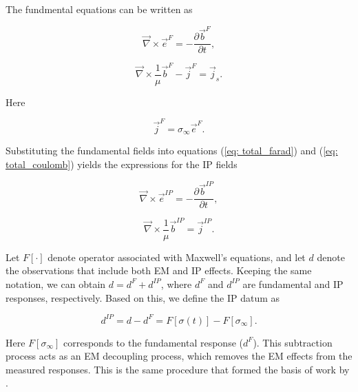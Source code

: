 \documentclass[extra,mreferee]{gji}
\newcommand{\curl}{{\vec \nabla}\times}
\newcommand{\siginf}{\sigma_\infty}
\renewcommand {\j}  { {\vec j} }
\renewcommand {\b}  { {\vec b} }
\newcommand {\e}  { {\vec e} }
\newcommand{\dip}{d^{IP}}
\begin{document}
The fundmental equations can be written as
\begin{linenomath*}
\begin{equation}
  \curl \e^{F} = -\frac{\partial \b^{F}}{\partial t},
  \label{eq: eq_primary_farad}
\end{equation}
\end{linenomath*}
\begin{linenomath*}
\begin{equation}
  \curl{\frac{1}{\mu}\b^{F}} -\j^{F} = \j_s.
  \label{eq: eq_primary_coulomb}
\end{equation}
\end{linenomath*}
Here
\begin{linenomath*}
\begin{equation}
  \j^{F} = \siginf\e^{F}.
  \label{eq: jF}
\end{equation}
\end{linenomath*}

Substituting the fundamental fields into equations (\ref{eq: total_farad}) and (\ref{eq: total_coulomb}) yields the expressions for the IP fields 
\begin{linenomath*}
\begin{equation}
  \curl \e^{IP} = -\frac{\partial \b^{IP}}{\partial t},
  \label{eq: eq_secondary_farad}
\end{equation}
\end{linenomath*}
\begin{linenomath*}
\begin{equation}
  \curl{\frac{1}{\mu}\b^{IP}} = \j^{IP}.
  \label{eq: eq_secondary_coulomb}
\end{equation}
\end{linenomath*}

Let $F[\cdot]$ denote operator associated with Maxwell’s equations, and let $d$ denote the observations that include both EM and IP effects. 
Keeping the same notation, we can obtain $d = d^{F} + \dip$, where $d^F$ and $\dip$ are fundamental and IP responses, respectively. 
Based on this, we define the IP datum as 
\begin{linenomath*}
\begin{equation}
  \dip = d - d^{F} = F[\sigma(t)]-F[\siginf].
    \label{eq: IPdatum_syn}
\end{equation}
\end{linenomath*}
Here $F[\siginf]$ corresponds to the fundamental response ($d^F$). 
This subtraction process acts as an EM decoupling process, which removes the EM effects from the measured responses. This is the same procedure that formed the basis of work by \cite{routh2001}. 
\end{document}
